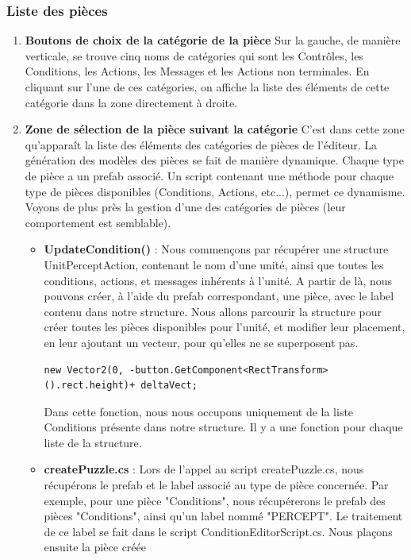 \documentclass{report}
\begin{document}
\subsubsection{Liste des pièces}
\begin{enumerate}[label=\Alph*)]
\item\textbf{Boutons de choix de la catégorie de la pièce} \newline
Sur la gauche, de manière verticale, se trouve cinq noms de catégories qui sont les Contrôles, les Conditions, les Actions, les Messages et les Actions non terminales. En cliquant sur l'une de ces catégories, on affiche la liste des éléments de cette catégorie dans la zone directement à droite.
\item\textbf{Zone de sélection de la pièce suivant la catégorie} \newline
C'est dans cette zone qu’apparaît la liste des éléments des catégories de pièces de l'éditeur. La génération des modèles des pièces se fait de manière dynamique. Chaque type de pièce a un prefab associé. \newline
Un script contenant une méthode pour chaque type de pièces disponibles (Conditions, Actions, etc...), permet ce dynamisme. Voyons de plus près la gestion d'une des catégories de pièces (leur comportement est semblable).
\begin{itemize}
\item\textbf{UpdateCondition()} : Nous commençons par récupérer une structure UnitPerceptAction, contenant le nom d'une unité, ainsi que toutes les conditions, actions, et messages inhérents à l'unité.\newline
A partir de là, nous pouvons créer, à l'aide du prefab correspondant, une pièce, avec le label contenu dans notre structure.
Nous allons parcourir la structure pour créer toutes les pièces disponibles pour l'unité, et modifier leur placement, en leur ajoutant un vecteur, pour qu'elles ne se superposent pas.
\begin{lstlisting}[frame=single]
new Vector2(0, -button.GetComponent<RectTransform>().rect.height)+ deltaVect;
\end{lstlisting}
Dans cette fonction, nous nous occupons uniquement de la liste Conditions présente dans notre structure. Il y a une fonction pour chaque liste de la structure.

\item\textbf{createPuzzle.cs} : Lors de l'appel au script createPuzzle.cs, nous récupérons le prefab et le label associé au type de pièce concernée. Par exemple, pour une pièce "Conditions", nous récupérerons le prefab des pièces "Conditions", ainsi qu'un label nommé "PERCEPT". Le traitement de ce label se fait dans le script ConditionEditorScript.cs.\newline
Nous plaçons ensuite la pièce créée 


\end{itemize}
\end{enumerate}
\end{document}
